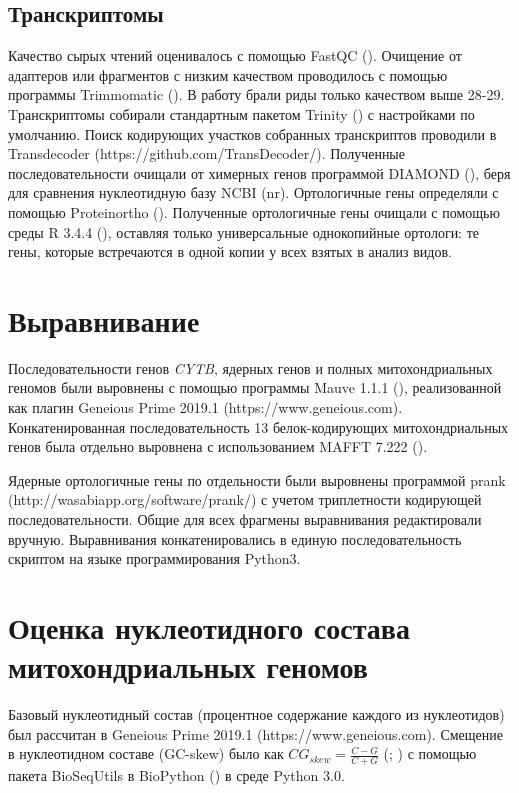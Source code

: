 \subsection{Транскриптомы}

Качество сырых чтений оценивалось с помощью FastQC (\cite{Andrews2010}). Очищение от адаптеров или фрагментов с низким качеством проводилось с помощью программы Trimmomatic (\cite{Bolger2014}). В работу брали риды только качеством выше 28-29. Tранскриптомы собирали стандартным пакетом Trinity (\cite{Grabherr2011}) с настройками по умолчанию. Поиск кодирующих участков собранных транскриптов проводили в Transdecoder (https://github.com/TransDecoder/). Полученные последовательности очищали от химерных генов программой DIAMOND (\cite{Buchfink2015}), беря для сравнения нуклеотидную базу NCBI (nr). Ортологичные гены определяли с помощью Proteinortho (\cite{Lechner2011}). Полученные ортологичные гены очищали с помощью среды R 3.4.4 (\cite{RCoreTeam2017}), оставляя только универсальные однокопийные ортологи: те гены, которые встречаются в одной копии у всех взятых в анализ видов. 


\section{Выравнивание}

Последовательности генов \textit{CYTB}, ядерных генов и полных митохондриальных геномов были выровнены с помощью программы Mauve 1.1.1 (\cite{Darling2004}), реализованной как плагин Geneious Prime 2019.1 (https://www.geneious.com). Конкатенированная последовательность 13 белок-кодирующих митохондриальных генов была отдельно выровнена с использованием MAFFT 7.222 (\cite{Katoh2014}).

Ядерные ортологичные гены по отдельности были выровнены программой prank (http://wasabiapp.org/software/prank/) с учетом триплетности кодирующей последовательности. Общие для всех фрагмены выравнивания редактировали вручную. Выравнивания конкатенировались в единую последовательность скриптом на языке программирования Python3.

\section{Оценка нуклеотидного состава митохондриальных геномов}

Базовый нуклеотидный состав (процентное содержание каждого из нуклеотидов) был рассчитан в Geneious Prime 2019.1 (https://www.geneious.com). Смещение в нуклеотидном составе (GC-skew) было как $CG_{skew} = \frac{C - G}{C + G}$ (\cite{Arabi2010}; \cite{Hassanin2005}) с помощью пакета BioSeqUtils в BioPython (\cite{Cock2009}) в среде Python 3.0.   

